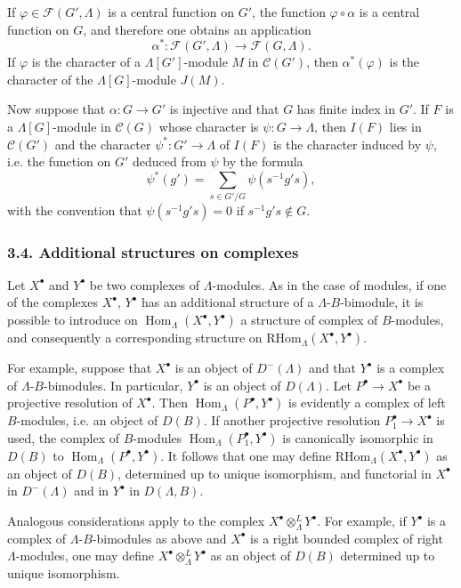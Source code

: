 \documentclass[11pt]{article}
\DeclareMathOperator{\Hom}{Hom}
\providecommand{\RHom}{\mathrm{RHom}}
\providecommand{\RHom}{\mathrm{RHom}}
\providecommand{\Hom}{\operatorname{Hom}}
\providecommand{\RHom}{\mathrm R\mathcal{H}om}
\providecommand{\RHom}{\mathrm{RHom}}
\providecommand{\Hom}{\operatorname{Hom}}
\begin{document}
If $\varphi\in\mathcal F(G',\Lambda)$ is a central function on $G'$, the function $\varphi\circ\alpha$ is a central function on $G$, and therefore one obtains an application
\[
\alpha^*: \mathcal F(G',\Lambda)\longrightarrow\mathcal F(G,\Lambda).
\]
If $\varphi$ is the character of a $\Lambda[G']$-module $M$ in $\mathcal C(G')$, then $\alpha^*(\varphi)$ is the character of the $\Lambda[G]$-module $J(M)$.

Now suppose that $\alpha:G\to G'$ is injective and that $G$ has finite index in $G'$. If $F$ is a $\Lambda[G]$-module in $\mathcal C(G)$ whose character is $\psi:G\to\Lambda$, then $I(F)$ lies in $\mathcal C(G')$ and the character $\psi^*:G'\to\Lambda$ of $I(F)$ is the character induced by $\psi$, i.e. the function on $G'$ deduced from $\psi$ by the formula
\[
\psi^*(g')=\sum_{s\in G'/G}\psi(s^{-1}g's),
\tag{3.3.1}
\]
with the convention that $\psi(s^{-1}g's)=0$ if $s^{-1}g's\notin G$.

\subsubsection*{3.4. Additional structures on complexes}

Let $X^\bullet$ and $Y^\bullet$ be two complexes of $\Lambda$-modules. As in the case of modules, if one of the complexes $X^\bullet$, $Y^\bullet$ has an additional structure of a $\Lambda$-$B$-bimodule, it is possible to introduce on $\Hom_\Lambda(X^\bullet,Y^\bullet)$ a structure of complex of $B$-modules, and consequently a corresponding structure on $\RHom_\Lambda(X^\bullet,Y^\bullet)$.

For example, suppose that $X^\bullet$ is an object of $D^-(\Lambda)$ and that $Y^\bullet$ is a complex of $\Lambda$-$B$-bimodules. In particular, $Y^\bullet$ is an object of $D(\Lambda)$. Let $P^\bullet\to X^\bullet$ be a projective resolution of $X^\bullet$. Then $\Hom_\Lambda(P^\bullet,Y^\bullet)$ is evidently a complex of left $B$-modules, i.e. an object of $D(B)$. If another projective resolution $P_1^\bullet\to X^\bullet$ is used, the complex of $B$-modules $\Hom_\Lambda(P_1^\bullet,Y^\bullet)$ is canonically isomorphic in $D(B)$ to $\Hom_\Lambda(P^\bullet,Y^\bullet)$. It follows that one may define $\RHom_\Lambda(X^\bullet,Y^\bullet)$ as an object of $D(B)$, determined up to unique isomorphism, and functorial in $X^\bullet$ in $D^-(\Lambda)$ and in $Y^\bullet$ in $D(\Lambda,B)$.

Analogous considerations apply to the complex $X^\bullet\otimes_\Lambda^L Y^\bullet$. For example, if $Y^\bullet$ is a complex of $\Lambda$-$B$-bimodules as above and $X^\bullet$ is a right bounded complex of right $\Lambda$-modules, one may define $X^\bullet\otimes_\Lambda^L Y^\bullet$ as an object of $D(B)$ determined up to unique isomorphism.
\end{document}
